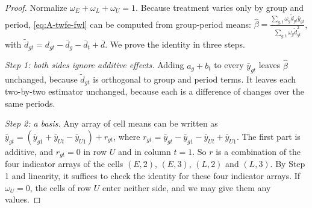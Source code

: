 \begin{proof}
Normalize $\omega_E+\omega_L+\omega_U=1$. Because treatment varies only by group and period, \eqref{eq:A-twfe-fwl}
can be computed from group-period means: $\hat\beta=\frac{\sum_{g,t}\omega_g\tilde d_{gt}\bar y_{gt}}{\sum_{g,t}\omega_g\tilde d_{gt}^2}$,
with $\tilde d_{gt}=d_{gt}-\bar d_g-\bar d_t+\bar d$. We prove the identity in three steps.

\emph{Step 1: both sides ignore additive effects.} Adding $a_g+b_t$ to every $\bar y_{gt}$ leaves $\hat\beta$
unchanged, because $\tilde d_{gt}$ is orthogonal to group and period terms. It leaves each two-by-two estimator
unchanged, because each is a difference of changes over the same periods.

\emph{Step 2: a basis.} Any array of cell means can be written as
$\bar y_{gt}=(\bar y_{g1}+\bar y_{Ut}-\bar y_{U1})+r_{gt}$, where $r_{gt}=\bar y_{gt}-\bar y_{g1}-\bar y_{Ut}+\bar y_{U1}$.
The first part is additive, and $r_{gt}=0$ in row $U$ and in column $t=1$. So $r$ is a combination of the four
indicator arrays of the cells $(E,2)$, $(E,3)$, $(L,2)$ and $(L,3)$. By Step 1 and linearity, it suffices to check
the identity for these four indicator arrays. If $\omega_U=0$, the cells of row $U$ enter neither side, and we may
give them any values.


\end{proof}
